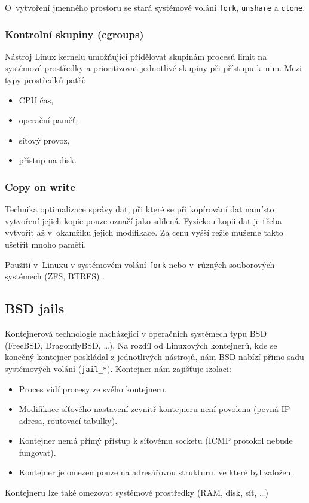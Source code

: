 
O~vytvoření jmenného prostoru se stará systémové volání \verb|fork|, \verb|unshare| a \verb|clone|.

\subsubsection{Kontrolní skupiny (cgroups)}

Nástroj Linux kernelu umožňující přidělovat skupinám procesů limit na systémové prostředky a prioritizovat jednotlivé skupiny při přístupu k~nim.
Mezi typy prostředků patří:

\begin{itemize}
	\item CPU čas,
	\item operační paměť,
	\item síťový provoz,
	\item přístup na disk.
\end{itemize} %

\subsubsection{Copy on write}


Technika optimalizace správy dat, při které se při kopírování dat namísto vytvoření jejich kopie pouze označí jako sdílená.
Fyzickou kopii dat je třeba vytvořit až v~okamžiku jejich modifikace.
Za cenu vyšší režie můžeme takto ušetřit mnoho paměti.
\cite{copy_on_write}

Použití v~Linuxu v systémovém volání \verb|fork| \cite{fork_manual} nebo v~různých souborových systémech (ZFS, BTRFS) \cite{fs_cow}.

\subsection{BSD jails}

Kontejnerová technologie nacházející v operačních systémech typu BSD (FreeBSD, DragonflyBSD, \ldots).
Na rozdíl od Linuxových kontejnerů, kde se konečný kontejner poskládal z jednotlivých nástrojů, nám BSD nabízí přímo sadu systémových volání (\verb|jail_*|).
Kontejner nám zajišťuje izolaci:

\begin{itemize}
	\item Proces vidí procesy ze svého kontejneru.
	\item Modifikace síťového nastavení zevnitř kontejneru není povolena (pevná IP adresa, routovací tabulky).
	\item Kontejner nemá přímý přístup k síťovému socketu (ICMP protokol nebude fungovat).
	\item Kontejner je omezen pouze na adresářovou strukturu, ve které byl založen.
\end{itemize}

Kontejneru lze také omezovat systémové prostředky (RAM, disk, síť, \ldots)



